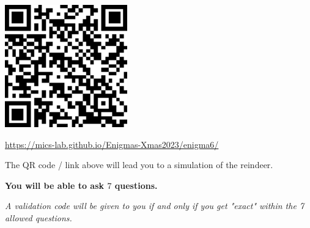 \documentclass[a4paper, top=10mm]{article}
\begin{document}
	\begin{center}
		\includegraphics[height=150pt]{06QR.png}
		
		\url{https://mics-lab.github.io/Enigmas-Xmas2023/enigma6/}
	\end{center}
	
	The QR code / link above will lead you to a simulation of the reindeer.
	
	\textbf{You will be able to ask $7$ questions.}
	
	\textit{A validation code will be given to you if and only if you get "exact" within the 7 allowed questions.}
	
\end{document}
